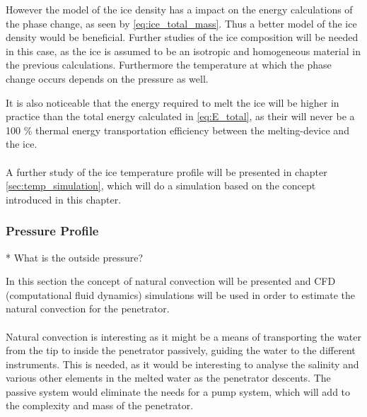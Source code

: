 However the model of the ice density has a impact on the energy calculations of the phase change, as seen by \eqref{eq:ice_total_mass}. Thus a better model of the ice density would be beneficial. Further studies of the ice composition will be needed in this case, as the ice is assumed to be an isotropic and homogeneous material in the previous calculations. Furthermore the temperature at which the phase change occurs depends on the pressure as well.

It is also noticeable that the energy required to melt the ice will be higher in practice than the total energy calculated in \eqref{eq:E_total}, as their will never be a 100 \% thermal energy transportation efficiency between the melting-device and the ice.
\\
\\
A further study of the ice temperature profile will be presented in chapter \ref{sec:temp_simulation}, which will do a simulation based on the concept introduced in this chapter.

\subsubsection{Pressure Profile}

* What is the outside pressure?


In this section the concept of natural convection will be presented and CFD (computational fluid dynamics) simulations will be used in order to estimate the natural convection for the penetrator.
\\
\\
Natural convection is interesting as it might be a means of transporting the water from the tip to inside the penetrator passively, guiding the water to the different instruments.  This is needed, as it would be interesting to analyse the salinity and various other elements in the melted water as the penetrator descents. The passive system would eliminate the needs for a pump system, which will add to the complexity and mass of the penetrator.


